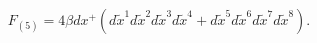 \begin{equation}
\label{fluxmaxpp}
F_{(5)} = 4 \beta dx^+ \left(d\tilde{x}^1 d\tilde{x}^2 d\tilde{x}^3 
d\tilde{x}^4 + d\tilde{x}^5 d\tilde{x}^6 d\tilde{x}^7 d\tilde{x}^8 \right).
\end{equation}

